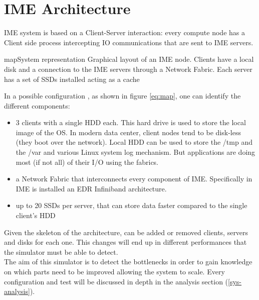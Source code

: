 
\chapter{IME Architecture}
IME system is based on a Client-Server interaction: every compute node has a
Client side process intercepting IO communications that are sent to IME servers.
\begin{myimage}{map}{System representation}
    Graphical layout of an IME node. Clients have a local disk and a connection
    to the IME servers through a Network Fabric. Each server has a set of SSDs
    installed acting as a cache
\end{myimage}
\newpage
In a possible configuration , as shown in figure \ref{eq:map}, one can identify
the different components:
\begin{itemize}
    \item 3 clients with a single HDD each. This hard drive is used to store
        the local image of the OS. In modern data center, client nodes tend
        to be disk-less (they boot over the network). Local HDD can be used
        to store the /tmp and the /var and various Linux system log
        mechanism. But applications are doing most (if not all) of their I/O
        using the fabrics.
    \item a Network Fabric that interconnects every component of IME.
        Specifically in IME is installed an EDR Infiniband architecture.
    \item up to 20 SSDs per server, that can store data faster compared to the single
        client's HDD
\end{itemize}

Given the skeleton of the architecture, can be added or removed clients,
servers and disks for each one. This changes will end up in different performances
that the simulator must be able to detect. \\
The aim of this simulator is to detect the bottlenecks in order to gain knowledge
on which parts need to be improved allowing the system to scale.
Every configuration and test will be discussed in depth in the analysis section
(\ref{sys-analysis}).

